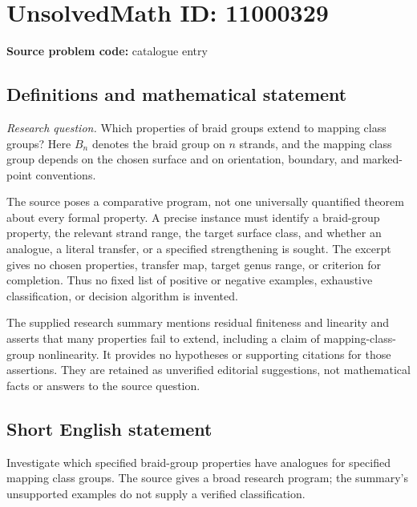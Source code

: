 \documentclass[11pt]{article}
\begin{document}
\section*{UnsolvedMath ID: 11000329}
\textbf{Source problem code:} catalogue entry
\subsection{Definitions and mathematical statement}
\emph{Research question.} Which properties of braid groups extend to mapping class groups? Here \(B_n\) denotes the braid group on \(n\) strands, and the mapping class group depends on the chosen surface and on orientation, boundary, and marked-point conventions.

The source poses a comparative program, not one universally quantified theorem about every formal property. A precise instance must identify a braid-group property, the relevant strand range, the target surface class, and whether an analogue, a literal transfer, or a specified strengthening is sought. The excerpt gives no chosen properties, transfer map, target genus range, or criterion for completion. Thus no fixed list of positive or negative examples, exhaustive classification, or decision algorithm is invented.

The supplied research summary mentions residual finiteness and linearity and asserts that many properties fail to extend, including a claim of mapping-class-group nonlinearity. It provides no hypotheses or supporting citations for those assertions. They are retained as unverified editorial suggestions, not mathematical facts or answers to the source question.
\subsection{Short English statement}
Investigate which specified braid-group properties have analogues for specified mapping class groups. The source gives a broad research program; the summary's unsupported examples do not supply a verified classification.
\end{document}
